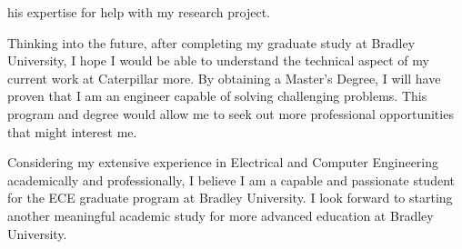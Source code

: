 \documentclass[a4paper]{article}
\begin{document}
his expertise for help with my research project.
\par Thinking into the future, after completing my graduate study at Bradley
University, I hope I would be able to understand the technical aspect of my
current work at Caterpillar more.
By obtaining a Master’s Degree, I will have proven that I am an engineer capable
of solving challenging problems.
This program and degree would allow me to seek out more professional
opportunities that might interest me.
\par Considering my extensive experience in Electrical and Computer Engineering
academically and professionally, I believe I am a capable and passionate student
for the ECE graduate program at Bradley University.
I look forward to starting another meaningful academic study for more advanced
education at Bradley University.
\end{document}
